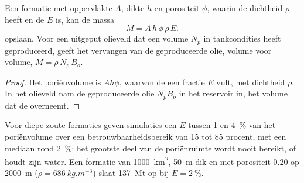 \begin{omfigure}
\begin{minipage}[b]{0.49\linewidth}
\end{minipage}
\par{}
\end{omfigure}

\begin{proposition}\label{prop:b2:energy-geology:capacity}
Een formatie met oppervlakte $A$, dikte $h$ en porositeit $\phi$, waarin  de dichtheid $\rho$ heeft
en de  $E$ is, kan de massa
\begin{equation}
M = A\,h\,\phi\,\rho\,E .
\label{eq:b2:energy-geology:capacity}
\end{equation}
opslaan. Voor een uitgeput olieveld dat een volume $N_p$ in tankcondities heeft geproduceerd, geeft het vervangen van de geproduceerde olie,
volume voor volume, $M = \rho\,N_p\,B_o$.
\end{proposition}

\begin{proof}
Het poriënvolume is $Ah\phi$, waarvan de  een fractie $E$ vult, met dichtheid $\rho$. In het
olieveld nam de geproduceerde olie $N_pB_o$ in het reservoir in, het volume dat de  overneemt.
\end{proof}

Voor diepe zoute formaties geven simulaties een $E$ tussen 1 en \qty{4}{\percent} van het poriënvolume
over een betrouwbaarheidsbereik van 15 tot 85 procent, met een mediaan rond \qty{2}{\percent}: het grootste deel van de
poriënruimte wordt nooit bereikt, of houdt zijn water. Een formatie van \qty{1000}{km^2}, \qty{50}{m} dik en met
porositeit 0.20 op \qty{2000}{m} ($\rho = \qty{686}{kg.m^{-3}}$) slaat \qty{137}{Mt} op bij $E =
\qty{2}{\percent}$.

